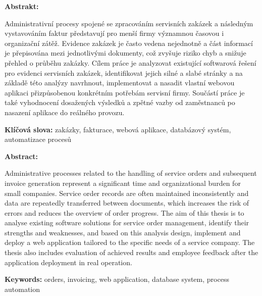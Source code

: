 \textsc{\nazevczradek}

\textbf{Abstrakt:}

Administrativní procesy spojené se zpracováním servisních zakázek a následným vystavováním faktur představují pro menší firmy významnou časovou i organizační zátěž. Evidence zakázek je často vedena nejednotně a část informací je přepisována mezi jednotlivými dokumenty, což zvyšuje riziko chyb a snižuje přehled o průběhu zakázky. Cílem práce je analyzovat existující softwarová řešení pro evidenci servisních zakázek, identifikovat jejich silné a slabé stránky a na základě této analýzy navrhnout, implementovat a nasadit vlastní webovou aplikaci přizpůsobenou konkrétním potřebám servisní firmy. Součástí práce je také vyhodnocení dosažených výsledků a zpětné vazby od zaměstnanců po nasazení aplikace do reálného provozu.

\textbf{Klíčová slova:} zakázky, fakturace, webová aplikace, databázový systém, automatizace procesů

\bigskip


\textsc{\nazeven}

\textbf{Abstract:}

Administrative processes related to the handling of service orders and subsequent invoice generation represent a significant time and organizational burden for small companies. Service order records are often maintained inconsistently and data are repeatedly transferred between documents, which increases the risk of errors and reduces the overview of order progress. The aim of this thesis is to analyse existing software solutions for service order management, identify their strengths and weaknesses, and based on this analysis design, implement and deploy a web application tailored to the specific needs of a service company. The thesis also includes evaluation of achieved results and employee feedback after the application deployment in real operation.

\textbf{Keywords:} orders, invoicing, web application, database system, process automation
